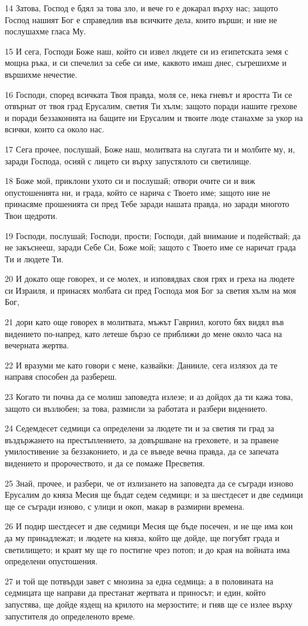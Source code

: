 \par 14 Затова, Господ е бдял за това зло, и вече го е докарал върху нас; защото Господ нашият Бог е справедлив във всичките дела, които върши; и ние не послушахме гласа Му.
\par 15 И сега, Господи Боже наш, който си извел людете си из египетската земя с мощна ръка, и си спечелил за себе си име, каквото имаш днес, съгрешихме и вършихме нечестие.
\par 16 Господи, според всичката Твоя правда, моля се, нека гневът и яростта Ти се отвърнат от твоя град Ерусалим, светия Ти хълм; защото поради нашите грехове и поради беззаконията на бащите ни Ерусалим и твоите люде станахме за укор на всички, които са около нас.
\par 17 Сега прочее, послушай, Боже наш, молитвата на слугата ти и молбите му, и, заради Господа, осияй с лицето си върху запустялото си светилище.
\par 18 Боже мой, приклони ухото си и послушай; отвори очите си и виж опустошенията ни, и града, който се нарича с Твоето име; защото ние не принасяме прошенията си пред Тебе заради нашата правда, но заради многото Твои щедроти.
\par 19 Господи, послушай; Господи, прости; Господи, дай внимание и подействай; да не закъснееш, заради Себе Си, Боже мой; защото с Твоето име се наричат града Ти и людете Ти.
\par 20 И докато още говорех, и се молех, и изповядвах своя грях и греха на людете си Израиля, и принасях молбата си пред Господа моя Бог за светия хълм на моя Бог,
\par 21 дори като още говорех в молитвата, мъжът Гавриил, когото бях видял във видението по-напред, като летеше бързо се приближи до мене около часа на вечерната жертва.
\par 22 И вразуми ме като говори с мене, казвайки: Данииле, сега излязох да те направя способен да разбереш.
\par 23 Когато ти почна да се молиш заповедта излезе; и аз дойдох да ти кажа това, защото си възлюбен; за това, размисли за работата и разбери видението.
\par 24 Седемдесет седмици са определени за людете ти и за светия ти град за въздържането на престъплението, за довършване на греховете, и за правене умилостивение за беззаконието,  и да се въведе вечна правда, да се запечата видението и пророчеството, и да се помаже Пресветия.
\par 25 Знай, прочее, и разбери, че от излизането на заповедта да се съгради изново Ерусалим до княза Месия ще бъдат седем седмици; и за шестдесет и две седмици ще се съгради изново, с улици и окоп, макар в размирни времена.
\par 26 И подир шестдесет и две седмици Месия ще бъде посечен, и не ще има кои да му принадлежат; и людете на княза, който ще дойде, ще погубят града и светилището; и краят му ще го постигне чрез потоп; и до края на войната има определени опустошения.
\par 27 и той ще потвърди завет с мнозина за една седмица; а в половината на седмицата ще направи да престанат жертвата и приносът; и един, който запустява, ще дойде яздещ на крилото на мерзостите; и гняв ще се излее върху запустителя до определеното време.

